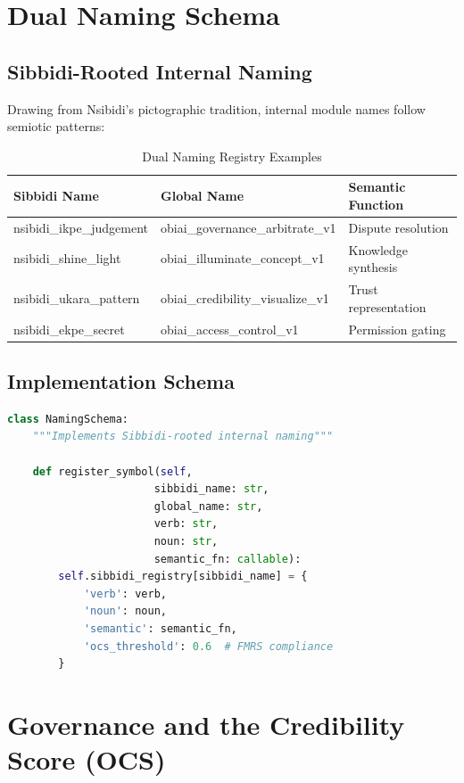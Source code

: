 \documentclass[12pt,a4paper]{article}
\begin{document}
\section{Dual Naming Schema}

\subsection{Sibbidi-Rooted Internal Naming}
Drawing from Nsibidi's pictographic tradition, internal module names follow semiotic patterns:

\begin{table}[h]
\centering
\begin{tabular}{|l|l|l|}
\hline
\textbf{Sibbidi Name} & \textbf{Global Name} & \textbf{Semantic Function} \\
\hline
nsibidi\_ikpe\_judgement & obiai\_governance\_arbitrate\_v1 & Dispute resolution \\
nsibidi\_shine\_light & obiai\_illuminate\_concept\_v1 & Knowledge synthesis \\
nsibidi\_ukara\_pattern & obiai\_credibility\_visualize\_v1 & Trust representation \\
nsibidi\_ekpe\_secret & obiai\_access\_control\_v1 & Permission gating \\
\hline
\end{tabular}
\caption{Dual Naming Registry Examples}
\end{table}

\subsection{Implementation Schema}
\begin{lstlisting}[language=Python]
class NamingSchema:
    """Implements Sibbidi-rooted internal naming"""
    
    def register_symbol(self, 
                       sibbidi_name: str, 
                       global_name: str,
                       verb: str, 
                       noun: str, 
                       semantic_fn: callable):
        self.sibbidi_registry[sibbidi_name] = {
            'verb': verb,
            'noun': noun,
            'semantic': semantic_fn,
            'ocs_threshold': 0.6  # FMRS compliance
        }
\end{lstlisting}

\section{Governance and the Credibility Score (OCS)}
\end{document}
